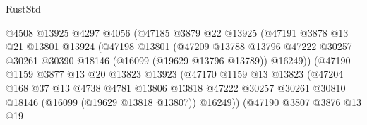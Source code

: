 \begin{lexlean}{RustStd}
\begin{coremodule}
                                @4508
                                @13925
                                @4297
                                @4056
                                (@47185
                                  @3879
                                  @22
                                  @13925
                                  (@47191
                                    @3878
                                    @13
                                    @21
                                    @13801
                                    @13924
                                    (@47198
                                      @13801
                                      (@47209
                                        @13788
                                        @13796
                                        @47222
                                        @30257
                                        @30261
                                        @30390
                                        @18146
                                        (@16099 (@19629 @13796 @13789))
                                        @16249))
                                    (@47190
                                      @1159
                                      @3877
                                      @13
                                      @20
                                      @13823
                                      @13923
                                      (@47170
                                        @1159
                                        @13
                                        @13823
                                        (@47204
                                          @168
                                          @37
                                          @13
                                          @4738
                                          @4781
                                          @13806
                                          @13818
                                          @47222
                                          @30257
                                          @30261
                                          @30810
                                          @18146
                                          (@16099 (@19629 @13818 @13807))
                                          @16249))
                                      (@47190
                                        @3807
                                        @3876
                                        @13
                                        @19

\end{coremodule}
\end{lexlean}
